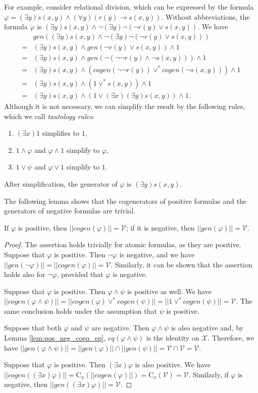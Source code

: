 \documentclass{lmcs}
\def\C{\textrm{C}}
\def\X{\mathcal X}
\def\V{\mathcal V}
\def\eq{eq}
\def\gen{gen}
\def\cogen{cogen}
\begin{document}
For example, consider relational division, which can be expressed by the formula $\varphi=(\exists y)s(x,y)\wedge(\forall y)(r(y)\to s(x,y))$. Without abbreviations, the formula $\varphi$ is $(\exists y)s(x,y)\wedge\neg(\exists y)\neg(\neg r(y)\vee s(x,y))$. We have
\begin{align*}
&\gen((\exists y)s(x,y)\wedge\neg(\exists y)\neg(\neg r(y)\vee s(x,y)))\\
=&(\exists y)s(x,y)\wedge\gen(\neg r(y)\vee s(x,y))\wedge 1\\
=&(\exists y)s(x,y)\wedge\gen(\neg(\neg\neg r(y)\wedge\neg s(x,y)))\wedge 1\\
=&(\exists y)s(x,y)\wedge(\cogen(\neg\neg r(y))\vee^*\cogen(\neg s(x,y)))\wedge 1\\
=&(\exists y)s(x,y)\wedge(1\vee^*s(x,y))\wedge 1\\
=&(\exists y)s(x,y)\wedge(1\vee(\exists x)(\exists y)s(x,y))\wedge 1.
\end{align*}
Although it is not necessary, we can simplify the result by the following rules, which we call \emph{tautology rules}:
\begin{enumerate}
\item $(\exists x)1$ simplifies to $1$,
\item $1\wedge \varphi$ and $\varphi\wedge 1$ simplify to $\varphi$,
\item $1\vee\psi$ and $\varphi\vee 1$ simplify to $1$.  
\end{enumerate}
After simplification, the generator of $\varphi$ is $(\exists y)s(x,y)$.

The following lemma shows that the cogenerators of positive formulas and the generators of negative formulas are trivial.
\begin{lem}\label{lem:pos_neg_cogen_gen}
If $\varphi$ is positive, then $||\cogen(\varphi)|| = \V$; if it is negative, then $||\gen(\varphi)|| = \V$.
\end{lem}
\begin{proof}
The assertion holds trivially for atomic formulas, as they are positive. Suppose that $\varphi$ is positive. Then $\neg\varphi$ is negative, and we have $||\gen(\neg\varphi)||=||\cogen(\varphi)||=\V$. Similarly, it can be shown that the assertion holds also for $\neg\varphi$, provided that $\varphi$ is negative. 

Suppose that $\varphi$ is positive. Then $\varphi\wedge\psi$ is positive as well. We have $||\cogen(\varphi\wedge\psi)||=||\cogen(\varphi)\vee^*\cogen(\psi)||=||1\vee^*\cogen(\psi)||=\V$. The same conclusion holds under the assumption that $\psi$ is positive.

Suppose that both $\varphi$ and $\psi$ are negative. Then $\varphi\wedge\psi$ is also negative and, by Lemma \ref{lem:pos_neg_coeq_eq}, $\eq(\varphi\wedge\psi)$ is the identity on $\X$. Therefore, we have $||\gen(\varphi\wedge\psi)||=||\gen(\varphi)||\cap||\gen(\psi)||=\V\cap\V=\V$.

Suppose that $\varphi$ is positive. Then $(\exists x)\varphi$ is also positive. We have $||\cogen((\exists x)\varphi)||=\C_x(||\cogen(\varphi)||)=\C_x(\V)=\V$. Similarly, if  $\varphi$ is negative, then $||\gen((\exists x)\varphi)||=\V$. 
\end{proof}
\end{document}
